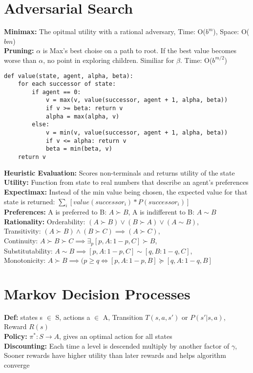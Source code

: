 \documentclass[11pt, a4paper]{article}
\begin{document}
\begin{multicols*}{1}
        \section*{Adversarial Search}
            \textbf{Minimax:} The opitmal utility with a rational adversary, Time: O($b^m$), Space: O($bm$)\\
            \textbf{Pruning:} $\alpha$ is Max's best choise on a path to root. If the best value becomes worse than $\alpha$, no point in exploring children. Similiar for $\beta$. Time: O($b^{m / 2}$)
            \begin{verbatim}
def value(state, agent, alpha, beta):
    for each successor of state:
        if agent == 0:
            v = max(v, value(successor, agent + 1, alpha, beta))
            if v >= beta: return v
            alpha = max(alpha, v)
        else:
            v = min(v, value(successor, agent + 1, alpha, beta))
            if v <= alpha: return v
            beta = min(beta, v)
    return v
            \end{verbatim}
            \textbf{Heuristic Evaluation:} Scores non-terminals and returns utility of the state\\
            \textbf{Utility:} Function from state to real numbers that describe an agent's preferences\\
            \textbf{Expectimax:} Instead of the min value being chosen, the expected value for that state is returned: $\sum_{i} [value(successor_{i}) * P(successor_{i})]$\\
            \textbf{Preferences:} A is preferred to B: $A \succ B$, A is indifferent to B: $A \sim B$\\
            \textbf{Rationality:} Orderability: $(A \succ B) \vee (B \succ A) \vee (A \sim B)$,\\ Transitivity: $(A \succ B) \land (B \succ C) \implies (A \succ C)$,\\ Continuity: $A \succ B \succ C \implies \exists_{p} [p, A: 1 - p, C] \succ B$, \\Substitutability: $A \sim B \implies [p, A: 1 - p, C] \sim [q, B: 1 - q, C]$, \\Monotonicity: $A \succ B \implies (p \geq q \iff [p, A: 1 - p, B] \succeq [q, A: 1 - q, B]$
        \section*{Markov Decision Processes}
            \textbf{Def:} states s $\in$ S, actions a $\in$ A, Transition $T(s, a, s')$ or $P(s' | s, a)$, Reward $R(s)$\\
            \textbf{Policy:} $\pi^{*}: S \to A$, gives an optimal action for all states\\
            \textbf{Discounting:} Each time a level is descended multiply by another factor of $\gamma$, Sooner rewards have higher utility than later rewards and helps algorithm converge\\
    \end{multicols*}
\end{document}
